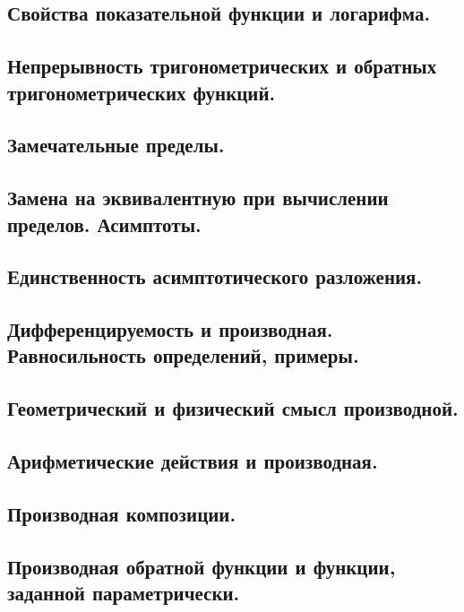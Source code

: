 \documentclass[12pt, a4paper]{article}
\begin{document}
\subsection{Свойства показательной функции и логарифма.}

\subsection{Непрерывность тригонометрических и обратных тригонометрических функций.}

\subsection{Замечательные пределы.}

\subsection{Замена на эквивалентную при вычислении пределов. Асимптоты.}

\subsection{Единственность асимптотического разложения.}

\subsection{Дифференцируемость и производная. Равносильность определений, примеры.}

\subsection{Геометрический и физический смысл производной.}

\subsection{Арифметические действия и производная.}

\subsection{Производная композиции.}

\subsection{Производная обратной функции и функции, заданной параметрически.}
\end{document}

